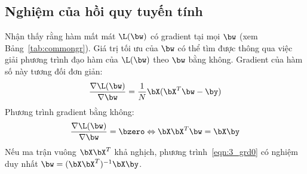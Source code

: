 



\subsection{Nghiệm của hồi quy tuyến tính}
Nhận thấy rằng hàm mất mát $\L(\bw)$ có gradient tại mọi $\bw$ (xem
Bảng~\ref{tab:commongr}). Giá trị tối ưu của $\bw$ có thể tìm được thông qua việc giải phương trình đạo hàm của $\L(\bw)$ theo $\bw$ bằng
không. Gradient của hàm số này tương đối đơn giản:
\begin{equation}
    \frac{\nabla \L(\bw)}{\nabla \bw} = \frac{1}{N}\bX(\bX^T\bw - \by)
\end{equation}
Phương trình gradient bằng không: 
\begin{equation}
    \label{eqn:3_grd0}
    \frac{\nabla \L(\bw)}{\nabla \bw} = \bzero 
    \Leftrightarrow \bX\bX^T\bw = \bX\by
\end{equation}
{Nếu ma trận vuông $\bX\bX^T$ khả nghịch}, phương trình~\eqref{eqn:3_grd0} có
nghiệm duy nhất $\bw = (\bX\bX^T)^{-1}\bX\by$. 

